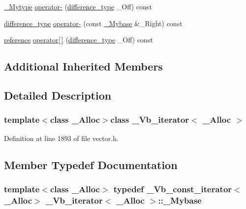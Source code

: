 \begin{DoxyCompactItemize}
\item 
\hyperlink{class___vb__const__iterator_acab47f643a88497fc0bb9c74afc59fde}{\+\_\+\+Mytype} \hyperlink{class___vb__iterator_aee20ce70ac1a5b71170f20e7aa7cb0c7}{operator-\/} (\hyperlink{class___vb__const__iterator_a5966ee8cd6e57759253addfa4821de91}{difference\+\_\+type} \+\_\+\+Off) const 
\item 
\hyperlink{class___vb__const__iterator_a5966ee8cd6e57759253addfa4821de91}{difference\+\_\+type} \hyperlink{class___vb__iterator_a99022c5a1a92e41f4eb02becde1062f0}{operator-\/} (const \hyperlink{class___vb__const__iterator_af4d51819174094e3576a3b45a3e3702f}{\+\_\+\+Mybase} \&\+\_\+\+Right) const 
\item 
\hyperlink{class___vb__const__iterator_a15c6fa96bc01a672faec26fbaa7279f4}{reference} \hyperlink{class___vb__iterator_ae5b762680c39e9fd49faead971121594}{operator\mbox{[}$\,$\mbox{]}} (\hyperlink{class___vb__const__iterator_a5966ee8cd6e57759253addfa4821de91}{difference\+\_\+type} \+\_\+\+Off) const 
\end{DoxyCompactItemize}
\subsection*{Additional Inherited Members}


\subsection{Detailed Description}
\subsubsection*{template$<$class \+\_\+\+Alloc$>$class \+\_\+\+Vb\+\_\+iterator$<$ \+\_\+\+Alloc $>$}



Definition at line 1893 of file vector.\+h.



\subsection{Member Typedef Documentation}
\hypertarget{class___vb__iterator_ad51a01f62e10e7da8f8aa6393e5fa4db}{
\subsubsection[{\+\_\+\+Mybase}]{\setlength{\rightskip}{0pt plus 5cm}template$<$class \+\_\+\+Alloc$>$ typedef {\bf \+\_\+\+Vb\+\_\+const\+\_\+iterator}$<$\+\_\+\+Alloc$>$ {\bf \+\_\+\+Vb\+\_\+iterator}$<$ \+\_\+\+Alloc $>$\+::{\bf \+\_\+\+Mybase}}}\label{class___vb__iterator_ad51a01f62e10e7da8f8aa6393e5fa4db}


